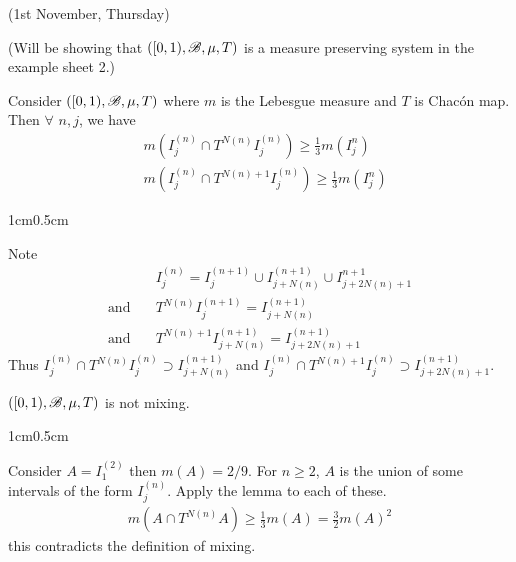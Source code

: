 \documentclass[10pt,a4paper]{report}
\newenvironment{proof}
{\begin{changemargin}{1cm}{0.5cm} 
	}%
	{\end{changemargin}
}
\begin{document}
\digression


\newday

(1st November, Thursday)
\s

(Will be showing that $([0,1), \mathscr{B}, \mu, T)$ is a measure preserving system in the example sheet 2.)
\s

\lem Consider $([0,1), \mathscr{B}, \mu, T)$ where $m$ is the Lebesgue measure and $T$ is Chac\'{o}n map. Then $\forall$ $n,j$, we have
\begin{align*}
& m(I^{(n)}_j \cap T^{N(n)} I^{(n)}_j) \geq \frac{1}{3}m(I_j^{n}) \\
& m(I^{(n)}_j \cap T^{N(n)+1} I^{(n)}_j) \geq \frac{1}{3}m(I_j^{n})
\end{align*}
\begin{proof}
\pf Note 
\begin{align*}
& I_j^{(n)} = I_{j}^{(n+1)} \cup I_{j+N(n)}^{(n+1)} \cup I_{j+2N(n)+1}^{n+1} \\
\text{and} \quad & T^{N(n)} I_j^{(n+1)}  = I^{(n+1)}_{j+N(n)} \\
\text{and} \quad & T^{N(n)+1} I^{(n+1)}_{j+N(n)} = I^{(n+1)}_{j+2N(n)+1}
\end{align*}
Thus $I^{(n)}_j \cap T^{N(n)} I_j^{(n)} \supset I^{(n+1)}_{j+N(n)}$ and $I^{(n)}_j \cap T^{N(n)+1} I^{(n)}_j \supset I^{(n+1)}_{j+2N(n)+1}$.

\eop
\end{proof}
\s

\thm $([0,1), \mathscr{B}, \mu, T)$ is not mixing.
\begin{proof}
\pf Consider $A= I^{(2)}_1$ then $m(A) = 2/9$. For $n\geq 2$, $A$ is the union of some intervals of the form $I^{(n)}_j$. Apply the lemma to each of these.
\begin{align*}
m(A\cap T^{N(n)} A) \geq \frac{1}{3} m(A) = \frac{3}{2} m(A)^2
\end{align*}
this contradicts the definition of mixing.

\eop
\end{proof}
\s
\end{document}
